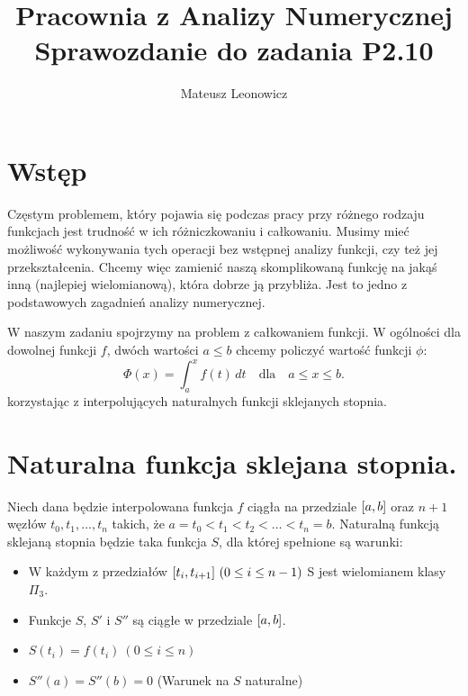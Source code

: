 \documentclass[a4paper]{article}
\title{\textbf{Pracownia z Analizy Numerycznej}\\{\Large Sprawozdanie do zadania P2.10}}
\author{Mateusz Leonowicz}
\newcommand{\RomanNumeralCaps}[1]
    {\MakeUppercase{\romannumeral #1}}
\begin{document}
\maketitle
\section{Wstęp}
    Częstym problemem, który pojawia się podczas pracy przy różnego rodzaju funkcjach
    jest trudność w ich różniczkowaniu i całkowaniu. Musimy mieć możliwość wykonywania tych operacji bez wstępnej analizy funkcji,
    czy też jej przekształcenia. Chcemy więc zamienić naszą skomplikowaną funkcję na jakąś inną (najlepiej wielomianową), która dobrze
    ją przybliża. Jest to jedno z podstawowych zagadnień analizy numerycznej. 

    W naszym zadaniu spojrzymy na problem z całkowaniem funkcji. 
    W ogólności dla dowolnej funkcji $f$, dwóch wartości $a \leq b$ chcemy policzyć wartość funkcji $\phi$:
    \[
        \Phi (x) = \int_{a}^{x} f(t) \, dt \quad \text{dla} \quad a \leq x \leq b.
    \]
    korzystając z interpolujących naturalnych funkcji sklejanych \RomanNumeralCaps{3} stopnia.

\tableofcontents

\newpage
\section{Naturalna funkcja sklejana \RomanNumeralCaps{3} stopnia.}
    Niech dana będzie interpolowana funkcja $f$ ciągła na przedziale $\interval[]{a}{b}$ oraz $n+1$ węzłów 
    $t_0, t_1, \dotsc, t_n$ \newline takich, że $a = t_0 < t_1 < t_2 < \dotsc < t_n = b$. Naturalną funkcją sklejaną 
    \RomanNumeralCaps{3} stopnia będzie taka funkcja $S$, dla której spełnione są warunki:
    \begin{itemize}
        \item W każdym z przedziałów $\interval[]{t_i}{t_{i+1}} \ (0 \leq i \leq n - 1)$ S jest wielomianem klasy $\Pi_3$.
        \item Funkcje $S$, $S'$ i $S''$ są ciągłe w przedziale $\interval[]{a}{b}$.
        \item $S(t_i) = f(t_i) \ (0 \leq i \leq n)$
        \item $S''(a) = S''(b) = 0$ (Warunek na $S$ naturalne)
    \end{itemize}
\end{document}
